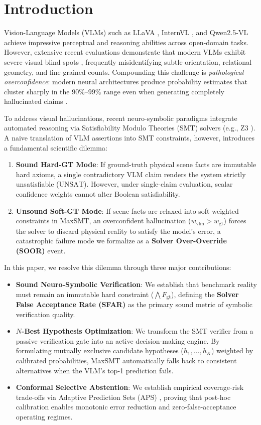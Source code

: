 \documentclass[10pt,twocolumn,letterpaper]{article}
\begin{document}
\section{Introduction}
Vision-Language Models (VLMs) such as LLaVA \cite{liu2024visual}, InternVL \cite{chen2024internvl}, and Qwen2.5-VL \cite{bai2025qwen25vl} achieve impressive perceptual and reasoning abilities across open-domain tasks. However, extensive recent evaluations demonstrate that modern VLMs exhibit severe visual blind spots \cite{tong2024eyes}, frequently misidentifying subtle orientation, relational geometry, and fine-grained counts. Compounding this challenge is \textit{pathological overconfidence}: modern neural architectures produce probability estimates that cluster sharply in the $90\%$--$99\%$ range even when generating completely hallucinated claims \cite{guo2017calibration}.

To address visual hallucinations, recent neuro-symbolic paradigms integrate automated reasoning via Satisfiability Modulo Theories (SMT) solvers (e.g., Z3 \cite{demoura2008z3}). A naive translation of VLM assertions into SMT constraints, however, introduces a fundamental scientific dilemma:
\begin{enumerate}
    \item \textbf{Sound Hard-GT Mode}: If ground-truth physical scene facts are immutable hard axioms, a single contradictory VLM claim renders the system strictly unsatisfiable ($\text{UNSAT}$). However, under single-claim evaluation, scalar confidence weights cannot alter Boolean satisfiability.
    \item \textbf{Unsound Soft-GT Mode}: If scene facts are relaxed into soft weighted constraints in MaxSMT, an overconfident hallucination ($w_{\text{vlm}} > w_{\text{gt}}$) forces the solver to discard physical reality to satisfy the model's error, a catastrophic failure mode we formalize as a \textbf{Solver Over-Override (SOOR)} event.
\end{enumerate}

In this paper, we resolve this dilemma through three major contributions:
\begin{itemize}
    \item \textbf{Sound Neuro-Symbolic Verification}: We establish that benchmark reality must remain an immutable hard constraint ($\bigwedge F_{\text{gt}}$), defining the \textbf{Solver False Acceptance Rate (SFAR)} as the primary sound metric of symbolic verification quality.
    \item \textbf{$N$-Best Hypothesis Optimization}: We transform the SMT verifier from a passive verification gate into an active decision-making engine. By formulating mutually exclusive candidate hypotheses ($h_1, \dots, h_K$) weighted by calibrated probabilities, MaxSMT automatically falls back to consistent alternatives when the VLM's top-1 prediction fails.
    \item \textbf{Conformal Selective Abstention}: We establish empirical coverage-risk trade-offs via Adaptive Prediction Sets (APS) \cite{romano2020classification}, proving that post-hoc calibration enables monotonic error reduction and zero-false-acceptance operating regimes.
\end{itemize}
\end{document}
